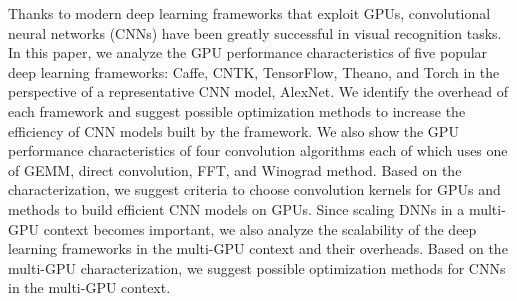 Thanks to modern deep learning frameworks that exploit GPUs, convolutional neural networks (CNNs) have been greatly successful in visual recognition tasks. In this paper, we analyze the GPU performance characteristics of five popular deep learning frameworks: Caffe, CNTK, TensorFlow, Theano, and Torch in the perspective of a representative CNN model, AlexNet. We identify the overhead of each framework and suggest possible optimization methods to increase the efficiency of CNN models built by the framework. We also show the GPU performance characteristics of four convolution algorithms each of which uses one of GEMM, direct convolution, FFT, and Winograd method. Based on the characterization, we suggest criteria to choose convolution kernels for GPUs and methods to build efficient CNN models on GPUs. Since scaling DNNs in a multi-GPU context becomes important, we also analyze the scalability of the deep learning frameworks in the multi-GPU context and their overheads. Based on the multi-GPU characterization, we suggest possible optimization methods for CNNs in the multi-GPU context.
